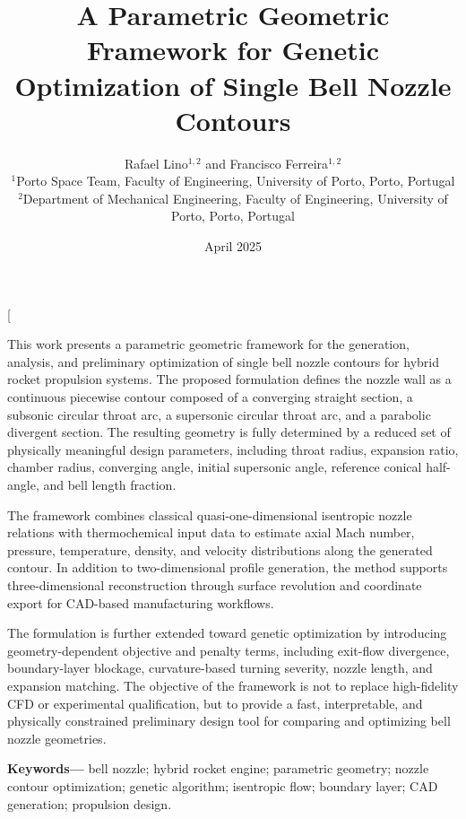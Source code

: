 \documentclass[11pt,a4paper]{article}
\title{A Parametric Geometric Framework for Genetic Optimization of Single Bell Nozzle Contours}
\author{
Rafael Lino$^{1,2}$ and Francisco Ferreira$^{1,2}$\\[3pt]
\small $^1$Porto Space Team, Faculty of Engineering, University of Porto, Porto, Portugal\\
\small $^2$Department of Mechanical Engineering, Faculty of Engineering, University of Porto, Porto, Portugal
}
\date{April 2025}
\begin{document}

\twocolumn[
\maketitle

\begin{onecolabstract}
This work presents a parametric geometric framework for the generation, analysis, and preliminary optimization of single bell nozzle contours for hybrid rocket propulsion systems. The proposed formulation defines the nozzle wall as a continuous piecewise contour composed of a converging straight section, a subsonic circular throat arc, a supersonic circular throat arc, and a parabolic divergent section. The resulting geometry is fully determined by a reduced set of physically meaningful design parameters, including throat radius, expansion ratio, chamber radius, converging angle, initial supersonic angle, reference conical half-angle, and bell length fraction.

The framework combines classical quasi-one-dimensional isentropic nozzle relations with thermochemical input data to estimate axial Mach number, pressure, temperature, density, and velocity distributions along the generated contour. In addition to two-dimensional profile generation, the method supports three-dimensional reconstruction through surface revolution and coordinate export for CAD-based manufacturing workflows.

The formulation is further extended toward genetic optimization by introducing geometry-dependent objective and penalty terms, including exit-flow divergence, boundary-layer blockage, curvature-based turning severity, nozzle length, and expansion matching. The objective of the framework is not to replace high-fidelity CFD or experimental qualification, but to provide a fast, interpretable, and physically constrained preliminary design tool for comparing and optimizing bell nozzle geometries.
\end{onecolabstract}

\vspace{0.8em}

\noindent\textbf{Keywords---}
bell nozzle; hybrid rocket engine; parametric geometry; nozzle contour optimization; genetic algorithm; isentropic flow; boundary layer; CAD generation; propulsion design.
\end{document}
